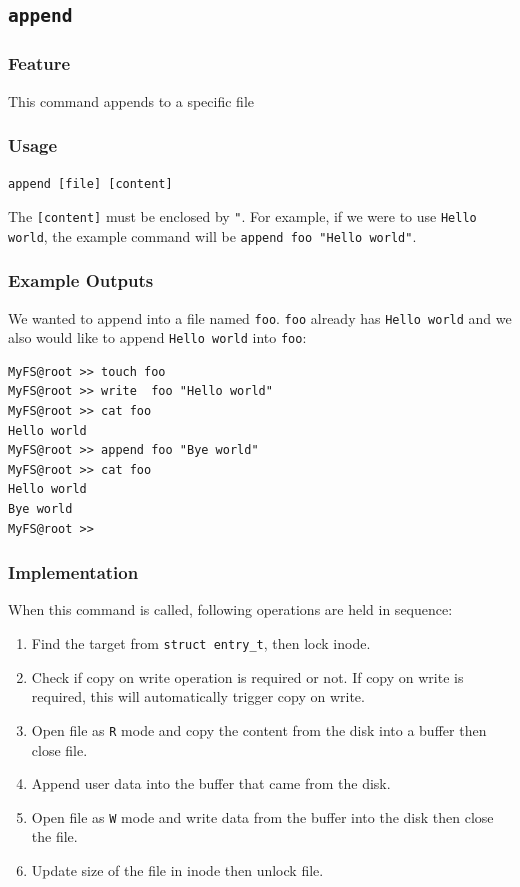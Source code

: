 \documentclass{homework}
\begin{document}
\subsection{\texttt{append}}
\subsubsection{Feature}
This command appends to a specific file
\subsubsection{Usage}
\begin{center}
\texttt{append [file] [content]}
\end{center}
The \texttt{[content]} must be enclosed by \texttt{"}. For example, if we were to use \texttt{Hello world}, the example command will be \texttt{append foo "Hello world"}.
\subsubsection{Example Outputs}
We wanted to append into a file named \texttt{foo}. \texttt{foo} already has \texttt{Hello world} and we also would like to append \texttt{Hello world} into \texttt{foo}:
\\
\begin{center}
\begin{code}
\begin{verbatim}
MyFS@root >> touch foo
MyFS@root >> write  foo "Hello world"
MyFS@root >> cat foo
Hello world
MyFS@root >> append foo "Bye world"
MyFS@root >> cat foo
Hello world
Bye world
MyFS@root >>
\end{verbatim}
\end{code}
\end{center}

\subsubsection{Implementation}
When this command is called, following operations are held in sequence:
\begin{enumerate}
    \item Find the target from \texttt{struct entry_t}, then lock inode.
    \item Check if copy on write operation is required or not. If copy on write is required, this will automatically trigger copy on write.
    \item Open file as \texttt{R} mode and copy the content from the disk into a buffer then close file.
    \item Append user data into the buffer that came from the disk.
    \item Open file as \texttt{W} mode and write data from the buffer into the disk then close the file.
    \item Update size of the file in inode then unlock file.
\end{enumerate}
\end{document}

